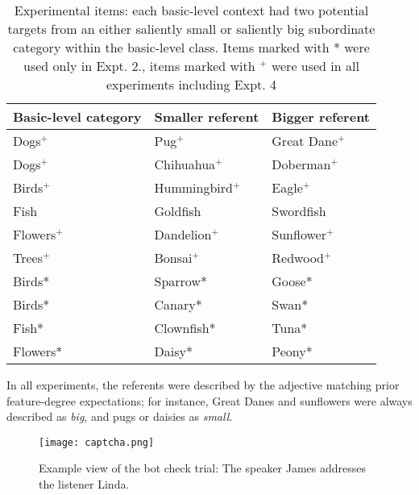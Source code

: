 \begin{table}[t]
	\small{
		\begin{center}
			\caption{Experimental items: each basic-level context had two potential targets from an either saliently small or saliently big subordinate category within the basic-level class. Items marked with * were used only in Expt. 2., items marked with $^{+}$ were used in all experiments including Expt. 4}
			\label{tab:stimuli}
			\vskip 0.12in
			\fontsize{10}{11}\selectfont
			\begin{tabularx}{\textwidth}{XXX}
				\hline
				Basic-level category & Smaller referent & Bigger referent\\
				\hline
				Dogs$^+$ & Pug$^+$ & Great Dane$^+$ \\
				Dogs$^+$ & Chihuahua$^+$ & Doberman$^+$\\
				Birds$^+$ & Hummingbird$^+$ & Eagle$^+$  \\
				Fish & Goldfish & Swordfish \\
				Flowers$^+$ & Dandelion$^+$ & Sunflower$^+$\\
				Trees$^+$ & Bonsai$^+$ & Redwood$^+$\\
				Birds* & Sparrow* & Goose* \\
				Birds* & Canary* & Swan* \\
				Fish* & Clownfish* & Tuna* \\
				Flowers* & Daisy* & Peony* \\
				\hline     
			\end{tabularx}
		\end{center}
	}
\end{table}

In all experiments, the referents were described by the adjective matching prior feature-degree expectations; for instance, Great Danes and sunflowers were always described as \textit{big}, and pugs or daisies as \textit{small}. 

\begin{figure*}[t]
	\begin{center}
		\texttt{[image: captcha.png]}
	\end{center}
	\caption{Example view of the bot check trial: The speaker James addresses the listener Linda.}
	\label{captcha}
\end{figure*}


